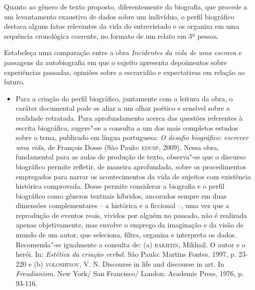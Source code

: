\documentclass[12pt]{extarticle}
\begin{document}
Quanto ao gênero de texto proposto, diferentemente da biografia, que
procede a um levantamento exaustivo de dados sobre um indivíduo, o
perfil biográfico destaca alguns fatos relevantes da vida do
entrevistado e os organiza em uma sequência cronológica coerente, no
formato de um relato em 3ª pessoa.

Estabeleça uma comparação entre a obra \emph{Incidentes da vida de uma
escrava} e passagens da autobiografia em que o sujeito apresenta
depoimentos sobre experiências passadas, opiniões sobre a escravidão e
expectativas em relação ao futuro.

\begin{itemize}
\item
  Para a criação do perfil biográfico, juntamente com a leitura da obra,
  o caráter documental pode se aliar a um olhar poético e sensível sobre
  a realidade retratada. Para aprofundamento acerca das questões
  referentes à escrita biográfica, sugere"-se a consulta a um dos mais
  completos estudos sobre o tema, publicado em língua portuguesa:
  \emph{O desafio biográfico: escrever uma vida}, de François Dosse (São
  Paulo: \textsc{edusp}, 2009). Nessa obra, fundamental para as aulas de produção
  de texto, observa"-se que o discurso biográfico permite refletir, de
  maneira aprofundada, sobre os procedimentos empregados para narrar os
  acontecimentos da vida de sujeitos com existência histórica
  comprovada. Dosse permite considerar a biografia e o perfil biográfico
  como gêneros textuais híbridos, ancorados sempre em duas dimensões
  complementares -- a histórica e a ficcional --, uma vez que a
  reprodução de eventos reais, vividos por alguém no passado, não é
  realizada apenas objetivamente, mas envolve o emprego da imaginação e
  da visão de mundo de um autor, que seleciona, filtra, organiza e
  interpreta os dados. Recomenda"-se igualmente a consulta de: (a)
  \textsc{bakhtin}, Mikhail. O autor e o herói. In: \emph{Estética da criação
  verbal}. São Paulo: Martins Fontes. 1997, p. 23-220 e (b) \textsc{voloshinov},
  V. N. Discourse in life and discourse in art. In \emph{Freudianism}.
  New York/ San Francisco/ London: Academic Press, 1976, p. 93-116.
\end{itemize}
\end{document}
